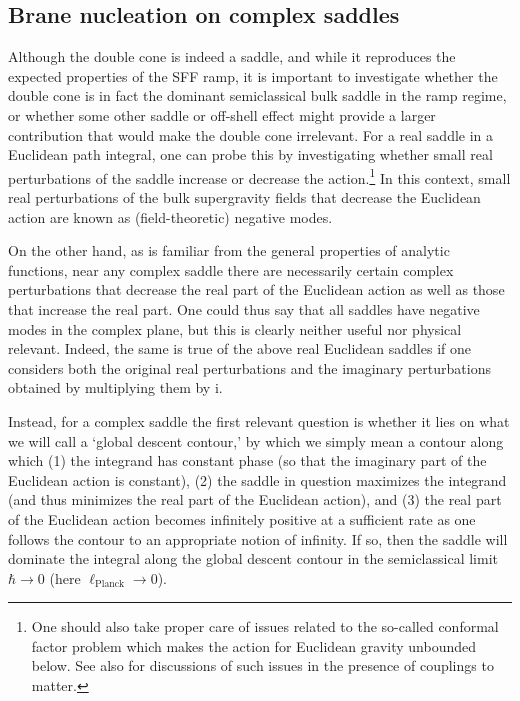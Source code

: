 \documentclass[11pt]{article}
\renewcommand{\i}{\mathrm{i}}
\begin{document}
\subsection{Brane nucleation on complex saddles}
\label{sec:saddlesanddescents}

Although the double cone is indeed a saddle, and while it reproduces the expected properties of the SFF ramp, it is important to investigate whether the double cone is in fact the dominant semiclassical bulk saddle in the ramp regime, or whether some other saddle or off-shell effect might provide a larger contribution that would make the double cone irrelevant.
For a real saddle in a Euclidean path integral, one can probe this by investigating whether small real perturbations of the saddle increase or decrease the action.\footnote{
    One should also take proper care of issues \cite{Gibbons:1976ue,Gibbons:1978ji,Hartle:1988xv,Gratton:1999ya,Khvedelidze:2000cp,Gratton:2000fj,Gratton:2001gw,Dasgupta:2001ue,Anninos:2012ft,Cotler:2019nbi,Benjamin:2020mfz} related to the so-called conformal factor problem which makes the action for Euclidean gravity unbounded below.
    See also \cite{Kol:2006ga,Monteiro:2008wr} for discussions of such issues in the presence of couplings to matter.
}
In this context, small real perturbations of the bulk supergravity fields that decrease the Euclidean action are known as (field-theoretic) negative modes.

On the other hand, as is familiar from the general properties of analytic functions, near any complex saddle there are necessarily certain complex perturbations that decrease the real part of the Euclidean action as well as those that increase the real part.
One could thus say that all saddles have negative modes in the complex plane, but this is clearly neither useful nor physical relevant.
Indeed, the same is true of the above real Euclidean saddles if one considers both the original real perturbations and the imaginary perturbations obtained by multiplying them by $\i$.


Instead, for a complex saddle the first relevant question is whether it lies on what we will call a `global descent contour,' by which we simply mean a contour along which (1) the integrand has constant phase (so that the imaginary part of the Euclidean action is constant), (2) the saddle in question maximizes the integrand (and thus minimizes the real part of the Euclidean action), and (3) the real part of the Euclidean action becomes infinitely positive at a sufficient rate as one follows the contour to an appropriate notion of infinity.
If so, then the saddle will dominate the integral along the global descent contour in the semiclassical limit  $\hbar \rightarrow 0$ (here $\ell_{\text{Planck}} \rightarrow 0$).
\end{document}
